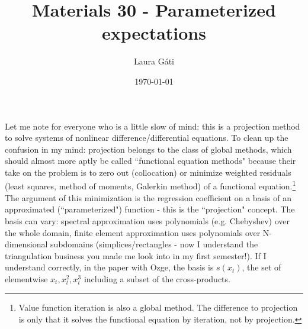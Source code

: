 \documentclass[11pt]{article}
\renewcommand{\[}{\begin{equation}}
\renewcommand{\]}{\end{equation}}
\begin{document}
\linespread{1.0}

\title{Materials 30 - Parameterized expectations}
\author{Laura G\'ati} 
\date{\today}
\maketitle




Let me note for everyone who is a little slow of mind: this is a projection method to solve systems of nonlinear difference/differential equations. To clean up the confusion in my mind: projection belongs to the class of global methods, which should almost more aptly be called ``functional equation methods" because their take on the problem is to zero out (collocation) or minimize weighted residuals (least squares, method of moments, Galerkin method) of a functional equation.\footnote{Value function iteration is also a global method. The difference to projection is only that it solves the functional equation by iteration, not by projection.} The argument of this minimization is the regression coefficient on a basis of an approximated (``parameterized") function - this is the ``projection" concept. The basis can vary: spectral approximation uses polynomials (e.g. Chebyshev) over the whole domain, finite element approximation uses polynomials over N-dimensional subdomains (simplices/rectangles - now I understand the triangulation business you made me look into in my first semester!). If I understand correctly, in the paper with Ozge, the basis is $s(x_t)$, the set of elementwise $x_t, x_t^2,x_t^3$ including a subset of the cross-products.
\end{document}

